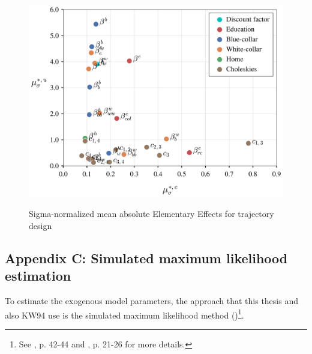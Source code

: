 \begin{figure}[H]
	\caption[Sigma-normalized mean absolute EEs for trajectory design]{Sigma-normalized mean absolute Elementary Effects for trajectory design}
	\centering
	\includegraphics[scale=0.52]{../scrypy/figures/scatter_traj}
	\label{fig:traj}
\end{figure}
\newpage


\subsection{Appendix C: Simulated maximum likelihood estimation}
\thispagestyle{plain} %
To estimate the exogenous model parameters, the approach that this thesis and also KW94 use is the simulated maximum likelihood method (\cite{Albright.1977})\footnote{See \cite{Aguirregabiria.2010}, p. 42-44 and \cite{Raabe.2019}, p. 21-26 for more details.}.

